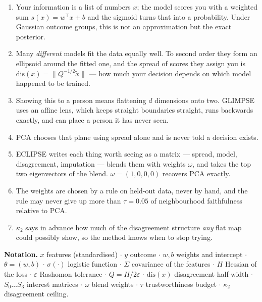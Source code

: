 \documentclass[11pt]{article}
\begin{document}
\begin{keybox}
\begin{enumerate}[leftmargin=*, itemsep=4pt]
  \item Your information is a list of numbers $x$; the model scores you with a weighted
        sum $s(x) = w^\top x + b$ and the sigmoid turns that into a probability. Under
        Gaussian outcome groups, this is not an approximation but the exact posterior.
  \item Many \emph{different} models fit the data equally well. To second order they
        form an ellipsoid around the fitted one, and the spread of scores they assign
        you is $\mathrm{dis}(x) = \|Q^{-1/2}\tilde{x}\|$ --- how much your decision
        depends on which model happened to be trained.
  \item Showing this to a person means flattening $d$ dimensions onto two. GLIMPSE uses
        an affine lens, which keeps straight boundaries straight, runs backwards
        exactly, and can place a person it has never seen.
  \item PCA chooses that plane using spread alone and is never told a decision exists.
  \item ECLIPSE writes each thing worth seeing as a matrix --- spread, model,
        disagreement, imputation --- blends them with weights $\omega$, and takes the
        top two eigenvectors of the blend. $\omega = (1,0,0,0)$ recovers PCA exactly.
  \item The weights are chosen by a rule on held-out data, never by hand, and the rule
        may never give up more than $\tau = 0.05$ of neighbourhood faithfulness
        relative to PCA.
  \item $\kappa_2$ says in advance how much of the disagreement structure \emph{any}
        flat map could possibly show, so the method knows when to stop trying.
\end{enumerate}
\end{keybox}

\vspace{6pt}
\noindent\textbf{Notation.}\quad
$x$ features (standardised) $\cdot$
$y$ outcome $\cdot$
$w, b$ weights and intercept $\cdot$
$\theta = (w,b)$ $\cdot$
$\sigma(\cdot)$ logistic function $\cdot$
$\Sigma$ covariance of the features $\cdot$
$H$ Hessian of the loss $\cdot$
$\varepsilon$ Rashomon tolerance $\cdot$
$Q = H/2\varepsilon$ $\cdot$
$\mathrm{dis}(x)$ disagreement half-width $\cdot$
$S_0 \ldots S_3$ interest matrices $\cdot$
$\omega$ blend weights $\cdot$
$\tau$ trustworthiness budget $\cdot$
$\kappa_2$ disagreement ceiling.
\end{document}
